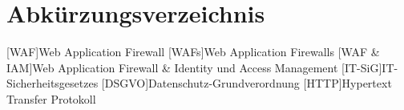 
\tableofcontents
\pagebreak

\section{Abkürzungsverzeichnis}

\begin{acronym}
    [WAF]{Web Application Firewall}
    [WAFs]{Web Application Firewalls}
    [WAF \& IAM]{Web Application Firewall \& Identity und Access Management}
    [IT-SiG]{IT-Sicherheitsgesetzes}
    [DSGVO]{Datenschutz-Grundverordnung}
    [HTTP]{Hypertext Transfer Protokoll}
\end{acronym}

\pagebreak

\listoffigures

\pagebreak